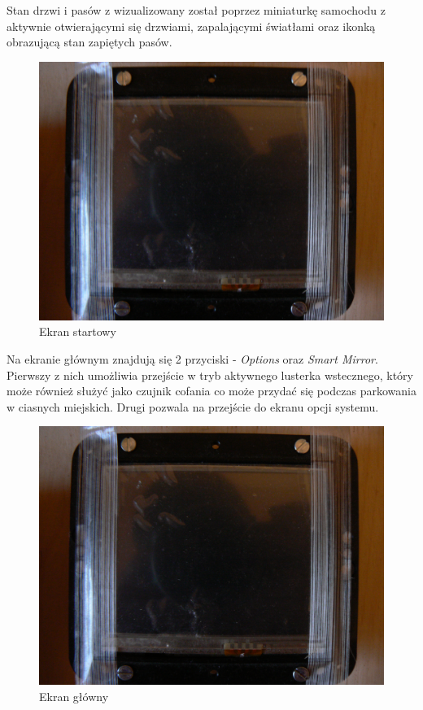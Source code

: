 \documentclass{xmgr}
\begin{document}
Stan drzwi i pasów z wizualizowany został poprzez miniaturkę samochodu z aktywnie otwierającymi się drzwiami, zapalającymi światłami oraz ikonką obrazującą stan zapiętych pasów.

\begin{figure}[!h]
    \centering
    	\includegraphics[height=0.3\textheight]{images/start.JPG}
    \caption{Ekran startowy}
\end{figure} 

Na ekranie głównym znajdują się 2 przyciski - \emph{Options} oraz \emph{Smart Mirror}. Pierwszy z nich umożliwia przejście w tryb aktywnego lusterka wstecznego, który może również służyć jako czujnik cofania co może przydać się podczas parkowania w ciasnych miejskich. Drugi pozwala na przejście do ekranu opcji systemu. 

\begin{figure}[!h]
    \centering
    	\includegraphics[height=0.3\textheight]{images/mainScreen.JPG}
    \caption{Ekran główny}
\end{figure}
\end{document}

